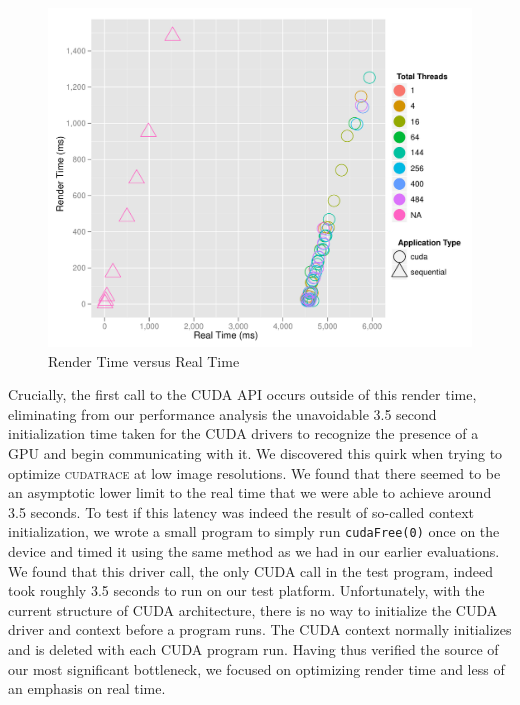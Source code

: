 \documentclass[12pt]{article}
\begin{document}
\begin{figure}
    \caption{Render Time versus Real Time} \label{fig:render_vs_real}
    \begin{center}
\includegraphics{cudatrace-003}
    \end{center}
\end{figure}


Crucially, the first call to the CUDA API occurs outside of this render time, eliminating from our performance analysis the unavoidable 3.5 second initialization time taken for the CUDA drivers to recognize the presence of a GPU and begin communicating with it. We discovered this quirk when trying to optimize \textsc{cudatrace} at low image resolutions. We found that there seemed to be an asymptotic lower limit to the real time that we were able to achieve around 3.5 seconds. To test if this latency was indeed the result of so-called context initialization, we wrote a small program to simply run \texttt{cudaFree(0)} once on the device and timed it using the same method as we had in our earlier evaluations. We found that this driver call, the only CUDA call in the test program, indeed took roughly 3.5 seconds to run on our test platform. Unfortunately, with the current structure of CUDA architecture, there is no way to initialize the CUDA driver and context before a program runs. The CUDA context normally initializes and is deleted with each CUDA program run. Having thus verified the source of our most significant bottleneck, we focused on optimizing render time and less of an emphasis on real time.
\end{document}

